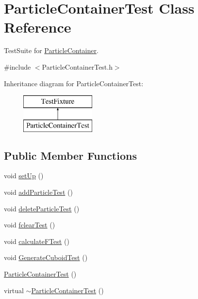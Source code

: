 \hypertarget{classParticleContainerTest}{}\section{Particle\+Container\+Test Class Reference}
\label{classParticleContainerTest}


Test\+Suite for \hyperlink{classParticleContainer}{Particle\+Container}.  




{\ttfamily \#include $<$Particle\+Container\+Test.\+h$>$}

Inheritance diagram for Particle\+Container\+Test\+:\begin{figure}[H]
\begin{center}
\leavevmode
\includegraphics[height=2.000000cm]{classParticleContainerTest}
\end{center}
\end{figure}
\subsection*{Public Member Functions}
\begin{DoxyCompactItemize}
\item 
void \hyperlink{classParticleContainerTest_a114674bf106f1237eb8e5d0afa2cead0}{set\+Up} ()
\item 
void \hyperlink{classParticleContainerTest_a3a4921704ae21a160f9b6c5e086dca5c}{add\+Particle\+Test} ()
\item 
void \hyperlink{classParticleContainerTest_a310fd3941f72ccbed84840167828152d}{delete\+Particle\+Test} ()
\item 
void \hyperlink{classParticleContainerTest_aedf461c006cedb3a707d355d9c472107}{fclear\+Test} ()
\item 
void \hyperlink{classParticleContainerTest_a623a17cee1bfde4ab23127163509d5b4}{calculate\+F\+Test} ()
\item 
void \hyperlink{classParticleContainerTest_a18827c80c7e7faba9bb992c38b95d718}{Generate\+Cuboid\+Test} ()
\item 
\hyperlink{classParticleContainerTest_ac9c892489b33cc0fb091eca01677f74e}{Particle\+Container\+Test} ()
\item 
virtual \hyperlink{classParticleContainerTest_a6fff30944bc8d19c2a838ac0735222fc}{$\sim$\+Particle\+Container\+Test} ()
\end{DoxyCompactItemize}
